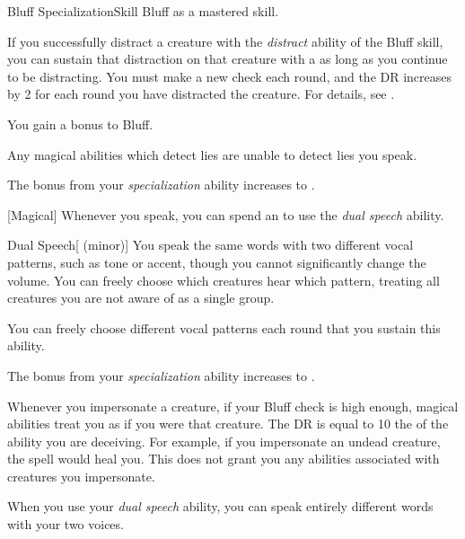     \begin{feat}{Bluff Specialization}{Skill}
        \featpre Bluff as a mastered skill.

         If you successfully distract a creature with the \textit{distract} ability of the Bluff skill, you can sustain that distraction on that creature with a  as long as you continue to be distracting.
        You must make a new check each round, and the DR increases by 2 for each round you have distracted the creature.
        For details, see .

         You gain a  bonus to Bluff.

         Any magical abilities which detect lies are unable to detect lies you speak.

         The bonus from your \textit{specialization} ability increases to .

        [Magical] Whenever you speak, you can spend an  to use the \textit{dual speech} ability.
        \begin{ability}{Dual Speech}[ (minor)]
            You speak the same words with two different vocal patterns, such as tone or accent, though you cannot significantly change the volume.
            You can freely choose which creatures hear which pattern, treating all creatures you are not aware of as a single group.

            You can freely choose different vocal patterns each round that you sustain this ability.
        \end{ability}

         The bonus from your \textit{specialization} ability increases to .

         Whenever you impersonate a creature, if your Bluff check is high enough, magical abilities treat you as if you were that creature.
        The DR is equal to 10 \add the  of the ability you are deceiving.
        For example, if you impersonate an undead creature, the  spell would heal you.
        This does not grant you any abilities associated with creatures you impersonate.

         When you use your \textit{dual speech} ability, you can speak entirely different words with your two voices.
    \end{feat}

